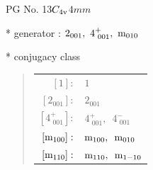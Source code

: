 \documentclass[fleqn,8pt]{jsarticle}
\begin{document}
\setcounter{MaxMatrixCols}{32}

\renewcommand{\tablename}{Table~}
\renewcommand{\figurename}{Figure~}
\begin{center}
\LARGE
PG No. 13\quad$C_{\rm 4v}$\quad$4mm$\quad[ tetragonal ]
\end{center}

* generator : $2{}_{001},\,\,4^{+}_{\,\,001},\,\,{\rm m}_{010}$

* conjugacy class
\begin{quote}
\begin{tabular}{rl}
$ [1]: $ & $ 1 $ \\
$ [2{}_{001}]: $ & $ 2{}_{001} $ \\
$ [4^{+}_{\,\,001}]: $ & $ 4^{+}_{\,\,001},\,\,\,4^{-}_{\,\,001} $ \\
$ [{\rm m}_{100}]: $ & $ {\rm m}_{100},\,\,\,{\rm m}_{010} $ \\
$ [{\rm m}_{110}]: $ & $ {\rm m}_{110},\,\,\,{\rm m}_{1-10} $
\end{tabular}
\end{quote}
\end{document}
